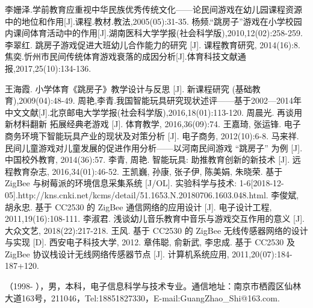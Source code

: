 \small
\begin{thebibliography}{99}
\setlength{\parskip}{0pt}  %
李姗泽.学前教育应重视中华民族优秀传统文化——论民间游戏在幼儿园课程资源中的地位和作用[J].课程.教材.教法,2005(05):31-35.
杨频.“跳房子”游戏在小学校园内课间体育活动中的作用[J].湖南医科大学学报(社会科学版),2010,12(02):258-259.
李翠红. 跳房子游戏促进大班幼儿合作能力的研究 [J]. 课程教育研究, 2014(16):8.
焦奕.忻州市民间传统体育游戏衰落的成因分析[J].体育科技文献通报,2017,25(10):134-136.

王海霞. 小学体育《跳房子》教学设计与反思 [J]. 新课程研究 (基础教育),2009(04):48-49.
周艳,李青.我国智能玩具研究现状述评——基于2002—2014年中文文献[J].北京邮电大学学报(社会科学版),2016,18(01):113-120.
周晨光. 再谈用新材料翻新 拓展经典老游戏 [J]. 体育教学, 2016,36(09):74.
王嘉琦, 张运锋. 电子商务环境下智能玩具产业的现状及对策分析 [J]. 电子商务, 2012(10):6-8.
马来祥. 民间儿童游戏对儿童发展的促进作用分析——以河南民间游戏 “跳房子” 为例 [J]. 中国校外教育, 2014(36):57.
李青, 周艳. 智能玩具: 助推教育创新的新技术 [J]. 远程教育杂志, 2016,34(01):46-52.
王凯巍, 孙康, 张子伊, 陈美娟, 朱晓荣. 基于 ZigBee 与树莓派的环境信息采集系统 [J/OL]. 实验科学与技术: 1-6[2018-12-05].http://kns.cnki.net/kcms/detail/51.1653.N.20180706.1603.048.html.
李俊斌, 胡永忠. 基于 CC2530 的 ZigBee 通信网络的应用设计 [J]. 电子设计工程, 2011,19(16):108-111.
李淑君. 浅谈幼儿音乐教育中音乐与游戏交互作用的意义 [J]. 大众文艺, 2018(22):217-218.
王风. 基于 CC2530 的 ZigBee 无线传感器网络的设计与实现 [D]. 西安电子科技大学, 2012.
章伟聪, 俞新武, 李忠成. 基于 CC2530 及 ZigBee 协议栈设计无线网络传感器节点 [J]. 计算机系统应用, 2011,20(07):184-187+120.


\end{thebibliography}
{

（1998- ），男，本科，电子信息科学与技术专业。通信地址：南京市栖霞区仙林大道163号，211046，Tel:18851827330，E-mail:GuangZhao\_Shi@163.com.
}


